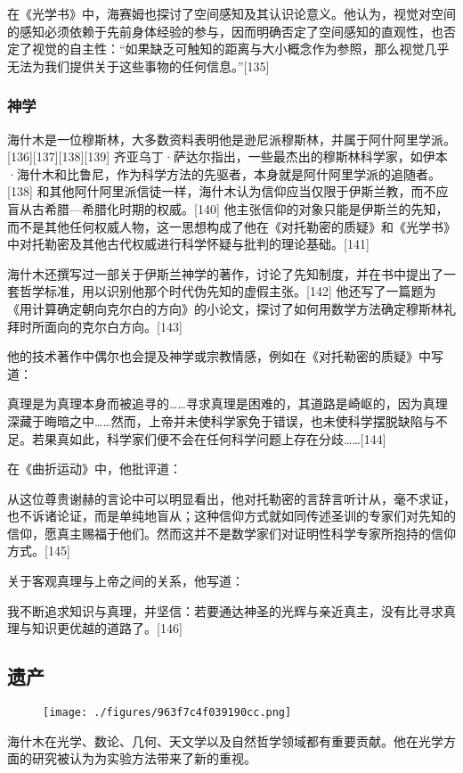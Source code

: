 在《光学书》中，海赛姆也探讨了空间感知及其认识论意义。他认为，视觉对空间的感知必须依赖于先前身体经验的参与，因而明确否定了空间感知的直观性，也否定了视觉的自主性：“如果缺乏可触知的距离与大小概念作为参照，那么视觉几乎无法为我们提供关于这些事物的任何信息。”[135]
\subsubsection{神学}
海什木是一位穆斯林，大多数资料表明他是逊尼派穆斯林，并属于阿什阿里学派。[136][137][138][139] 齐亚乌丁·萨达尔指出，一些最杰出的穆斯林科学家，如伊本·海什木和比鲁尼，作为科学方法的先驱者，本身就是阿什阿里学派的追随者。[138] 和其他阿什阿里派信徒一样，海什木认为信仰应当仅限于伊斯兰教，而不应盲从古希腊—希腊化时期的权威。[140] 他主张信仰的对象只能是伊斯兰的先知，而不是其他任何权威人物，这一思想构成了他在《对托勒密的质疑》和《光学书》中对托勒密及其他古代权威进行科学怀疑与批判的理论基础。[141]

海什木还撰写过一部关于伊斯兰神学的著作，讨论了先知制度，并在书中提出了一套哲学标准，用以识别他那个时代伪先知的虚假主张。[142] 他还写了一篇题为《用计算确定朝向克尔白的方向》的小论文，探讨了如何用数学方法确定穆斯林礼拜时所面向的克尔白方向。[143]

他的技术著作中偶尔也会提及神学或宗教情感，例如在《对托勒密的质疑》中写道：

真理是为真理本身而被追寻的……寻求真理是困难的，其道路是崎岖的，因为真理深藏于晦暗之中……然而，上帝并未使科学家免于错误，也未使科学摆脱缺陷与不足。若果真如此，科学家们便不会在任何科学问题上存在分歧……[144]

在《曲折运动》中，他批评道：

从这位尊贵谢赫的言论中可以明显看出，他对托勒密的言辞言听计从，毫不求证，也不诉诸论证，而是单纯地盲从；这种信仰方式就如同传述圣训的专家们对先知的信仰，愿真主赐福于他们。然而这并不是数学家们对证明性科学专家所抱持的信仰方式。[145]

关于客观真理与上帝之间的关系，他写道：

我不断追求知识与真理，并坚信：若要通达神圣的光辉与亲近真主，没有比寻求真理与知识更优越的道路了。[146]
\subsection{遗产}
\begin{figure}[ht]
\centering
\texttt{[image: ./figures/963f7c4f039190cc.png]}
\caption{} \label{fig_YBH_5}
\end{figure}
海什木在光学、数论、几何、天文学以及自然哲学领域都有重要贡献。他在光学方面的研究被认为为实验方法带来了新的重视。

